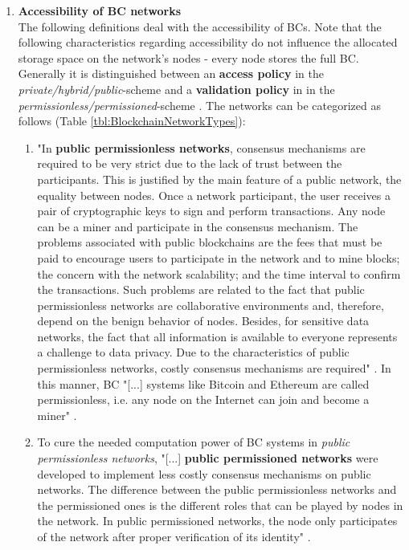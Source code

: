 \begin{enumerate}
	\item \textbf{Accessibility of BC networks} \\
	The following definitions deal with the accessibility of \gls{BC}s.
	Note that the following characteristics regarding accessibility do not influence
	the allocated storage space on the network's nodes - every node stores the full \gls{BC}.
	Generally it is distinguished between an \textbf{access policy} in the \textit{private/hybrid/public}-scheme
	and a \textbf{validation policy} in in the \textit{permissionless/permissioned}-scheme \cite[2]{Daniel.2019}.	
	The networks can be categorized as follows (Table \ref{tbl:BlockchainNetworkTypes}):
	
	\begin{enumerate}
		\item "In \textbf{public permissionless networks}, consensus mechanisms are required to be very strict due to the lack of trust between the participants.
		This is justified by the main feature of a public network, the equality between nodes.
		Once a network participant, the user receives a pair of cryptographic keys to sign and perform transactions.
		Any node can be a miner and participate in the consensus mechanism.
		The problems associated with public blockchains are the fees that must be paid to encourage users to participate in the network and to mine blocks;
		the concern with the network scalability; and the time interval to confirm the transactions.
		Such problems are related to the fact that public permissionless networks are collaborative environments and,
		therefore, depend on the benign behavior of nodes. Besides, for sensitive data networks,
		the fact that all information is available to everyone represents a challenge to data privacy.
		Due to the characteristics of public permissionless networks, costly consensus mechanisms are required" \cite[182]{Oliveira.2019}.
		\label{def:PublicPermissionlessBCNetworks}
		In this manner, \gls{BC} "[...] systems like Bitcoin and Ethereum are called permissionless, i.e. any node on the Internet can join and become a miner" \cite[1]{Angelis.2018}.
		
		\item To cure the needed computation power of \gls{BC} systems in \textit{public permissionless networks},
		"[...] \textbf{public permissioned networks} were developed to implement less costly consensus mechanisms on public networks.
		The difference between the public permissionless networks and the permissioned ones is the different roles that can be played by nodes in the network.
		In public permissioned networks, the node only participates of the network after proper verification of its identity" \cite[182]{Oliveira.2019}.
		\label{def:PublicPermissionedBCNetworks}
		

\end{enumerate}
\end{enumerate}
